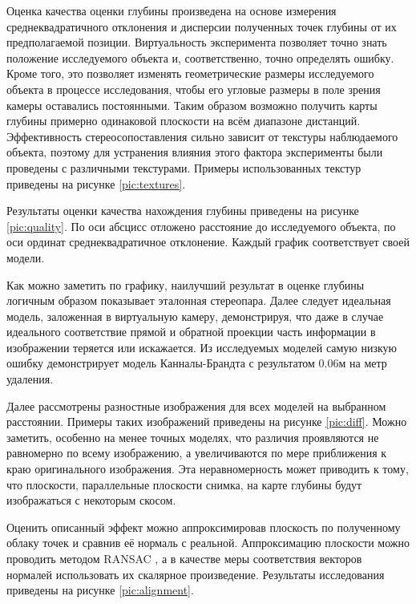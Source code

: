 Оценка качества оценки глубины произведена на основе измерения среднеквадратичного отклонения и дисперсии полученных точек 
глубины от их предполагаемой позиции. Виртуальность эксперимента позволяет точно знать положение исследуемого объекта и, соответственно, 
точно определять ошибку. Кроме того, это позволяет изменять геометрические размеры исследуемого объекта в процессе исследования, чтобы его
угловые размеры в поле зрения камеры оставались постоянными. Таким образом возможно получить карты глубины примерно одинаковой 
плоскости на всём диапазоне дистанций.  Эффективность стереосопоставления \cite{SGBM} сильно зависит от текстуры наблюдаемого объекта, 
поэтому для устранения влияния этого фактора эксперименты были проведены с различными текстурами. 
Примеры использованных текстур приведены на рисунке \ref{pic:textures}. 


Результаты оценки качества нахождения глубины приведены на рисунке \ref{pic:quality}. По оси абсцисс отложено расстояние до исследуемого объекта,
по оси ординат среднеквадратичное отклонение. Каждый график соответствует своей модели.

Как можно заметить по графику, наилучший результат в оценке глубины логичным образом показывает эталонная стереопара. Далее следует 
идеальная модель, заложенная в виртуальную камеру, демонстрируя, что даже в случае идеального соответствие прямой и обратной проекции часть 
информации в изображении теряется или искажается. Из исследуемых моделей самую низкую ошибку демонстрирует модель Канналы-Брандта с результатом
0.06м на метр удаления. 

Далее рассмотрены разностные изображения для всех моделей на выбранном расстоянии. Примеры таких изображений приведены на рисунке \ref{pic:diff}.
Можно заметить, особенно на менее точных моделях, что различия проявляются не равномерно по всему изображению, а увеличиваются по мере приближения 
к краю оригинального изображения. Эта неравномерность может приводить к тому, что плоскости, параллельные плоскости снимка, на карте глубины будут 
изображаться с некоторым скосом.



Оценить описанный эффект можно аппроксимировав плоскость по полученному облаку точек и сравнив её нормаль с реальной. Аппроксимацию плоскости можно проводить
методом RANSAC \cite{kinect_perf}, а в качестве меры соответствия векторов нормалей использовать их скалярное произведение.  
Результаты исследования приведены на рисунке \ref{pic:alignment}.  

